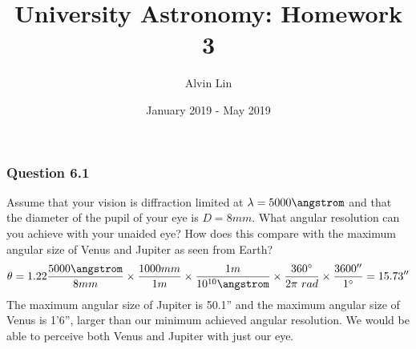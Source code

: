 \documentclass{math}
\title{University Astronomy: Homework 3}
\author{Alvin Lin}
\date{January 2019 - May 2019}
\begin{document}
\maketitle

\subsubsection*{Question 6.1}
Assume that your vision is diffraction limited at \( \lambda = 5000\angstrom \)
and that the diameter of the pupil of your eye is \( D = 8 mm \). What angular
resolution can you achieve with your unaided eye? How does this compare with the
maximum angular size of Venus and Jupiter as seen from Earth?
\[ \theta = 1.22\frac{5000\angstrom}{8 mm}\times\frac{1000mm}{1m}\times
  \frac{1 m}{10^{10}\angstrom}\times\frac{360^{\circ}}{2\pi~rad}\times
  \frac{3600''}{1^{\circ}} = 15.73'' \]
The maximum angular size of Jupiter is 50.1'' and the maximum angular size of
Venus is 1'6'', larger than our minimum achieved angular resolution. We would
be able to perceive both Venus and Jupiter with just our eye.
\end{document}
